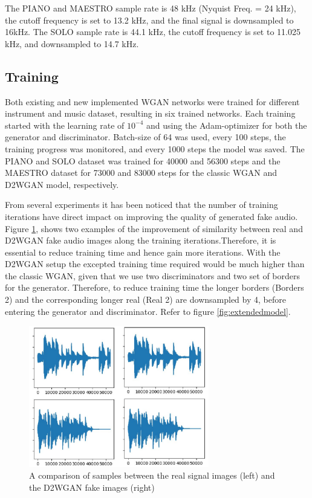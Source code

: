 \documentclass{article} %
\begin{document}
The PIANO and MAESTRO sample rate is 48 kHz (Nyquist Freq. = 24 kHz), the cutoff frequency is set to 13.2 kHz, and the final signal is downsampled to 16kHz. The SOLO sample rate is 44.1 kHz, the cutoff frequency is set to 11.025 kHz, and downsampled to 14.7 kHz.

\subsection{Training}
Both existing and new implemented WGAN networks were trained for different instrument and music dataset, resulting in six trained networks. Each training started with the learning rate of $10^{-4}$ and using the Adam-optimizer for both the generator and discriminator. Batch-size of 64 was used, every 100 steps, the training progress was monitored, and every 1000 steps the model was saved. The PIANO and SOLO dataset was trained for 40000 and 56300 steps and the MAESTRO dataset for 73000 and 83000 steps for the classic WGAN and D2WGAN model, respectively. 

From several experiments it has been noticed that the number of training iterations have direct impact on improving the quality of generated fake audio. Figure \ref{fig:realfakeimages}, shows two examples of the improvement of similarity between real and D2WGAN fake audio images along the training iterations.Therefore, it is essential to reduce training time and hence gain more iterations. With the D2WGAN setup the excepted training time required would be much higher than the classic WGAN, given that we use two discriminators and two set of borders for the generator. Therefore, to reduce training time the longer borders (Borders 2) and the corresponding longer real (Real 2) are downsampled by 4, before entering the generator and discriminator. Refer to figure \ref{fig:extendedmodel}.

\begin{figure}[h]
    \includegraphics[width=0.7\textwidth]{images/extend/extend_realfake_image.jpg}
    \centering
    \caption{A comparison of samples between the real signal images (left) and the D2WGAN fake images (right)}
    \label{fig:realfakeimages}
\end{figure}
\end{document}
